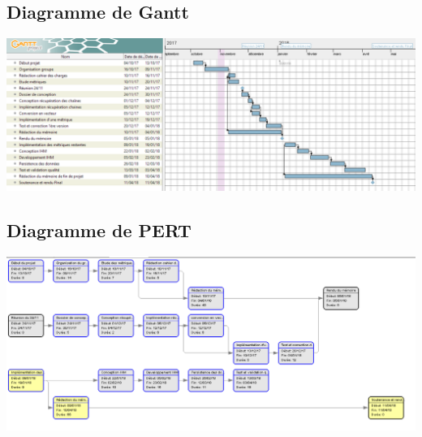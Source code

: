 \documentclass[a4paper, 12pt, twoside]{article}
\begin{document}
\subsection{Diagramme de Gantt}
\centering
      \includegraphics[width=1\textwidth]{gantt(1).pdf}
\subsection{Diagramme de PERT}
\centering
      \includegraphics[width=1\textwidth]{pert(1)(1).pdf}


\end{document}
